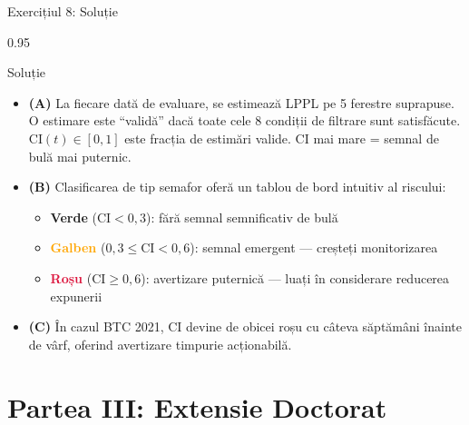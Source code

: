 \documentclass[9pt, aspectratio=169, t]{beamer}
\begin{document}
\begin{frame}{Exercițiul 8: Soluție}
    \begin{cminipage}{0.95\textwidth}
    \begin{exampleblock}{Soluție}
        {\small
        \begin{itemize}\setlength{\itemsep}{3pt}
            \item \textcolor{MainBlue}{\textbf{(A)}} La fiecare dată de evaluare, se estimează LPPL pe 5 ferestre suprapuse. O estimare este ``validă'' dacă toate cele 8 condiții de filtrare sunt satisfăcute. $\text{CI}(t) \in [0, 1]$ este fracția de estimări valide. CI mai mare = semnal de bulă mai puternic.
            \item \textcolor{MainBlue}{\textbf{(B)}} Clasificarea de tip semafor oferă un tablou de bord intuitiv al riscului:
                \begin{itemize}\setlength{\itemsep}{0pt}
                    \item \textcolor{Forest}{\textbf{Verde}} ($\text{CI} < 0{,}3$): fără semnal semnificativ de bulă
                    \item \textcolor{Orange}{\textbf{Galben}} ($0{,}3 \leq \text{CI} < 0{,}6$): semnal emergent --- creșteți monitorizarea
                    \item \textcolor{Crimson}{\textbf{Roșu}} ($\text{CI} \geq 0{,}6$): avertizare puternică --- luați în considerare reducerea expunerii
                \end{itemize}
            \item \textcolor{MainBlue}{\textbf{(C)}} În cazul BTC 2021, CI devine de obicei roșu cu câteva săptămâni înainte de vârf, oferind avertizare timpurie acționabilă.
        \end{itemize}
        }
    \end{exampleblock}
    \end{cminipage}
\end{frame}

\section{Partea III: Extensie Doctorat}
\end{document}
